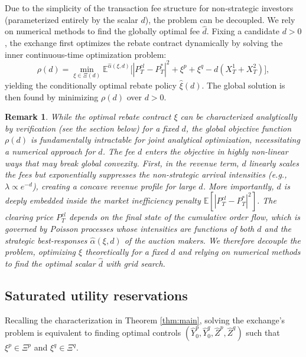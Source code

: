 \documentclass[12pt]{article}
\newtheorem{remark}[theorem2]{Remark}
\begin{document}
Due to the simplicity of the transaction fee structure for non-strategic investors (parameterized entirely by the scalar $d$), the problem can be decoupled. We rely on numerical methods to find the globally optimal fee $\hat{d}$. Fixing a candidate $d>0$, the exchange first optimizes the rebate contract dynamically by solving the inner continuous-time optimization problem:
\begin{equation}\label{eq:exchange_incentive}
    \rho(d) = \min_{\xi \in \Xi(d)} \mathbb{E}^{\hat{\alpha}(\xi,d)}\Big[ |P^{cl}_T - P_T^{*}|^2 + \xi^p + \xi^q - d(X^1_T + X^2_T) \Big],
\end{equation}
yielding the conditionally optimal rebate policy $\hat{\xi}(d)$. The global solution is then found by minimizing $\rho(d)$ over $d > 0$.

\begin{remark}
While the optimal rebate contract $\xi$ can be characterized analytically by verification (see the section below) for a fixed $d$, the global objective function $\rho(d)$ is fundamentally intractable for joint analytical optimization, necessitating a numerical approach for $\hat{d}$. The fee $d$ enters the objective in highly non-linear ways that may break global convexity. First, in the revenue term, $d$ linearly scales the fees but exponentially suppresses the non-strategic arrival intensities (e.g., $\lambda \propto e^{-d}$), creating a concave revenue profile for large $d$. More importantly, $d$ is deeply embedded inside the market inefficiency penalty $\mathbb{E}[|P^{cl}_T - P_T^{*}|^2]$. The clearing price $P^{cl}_T$ depends on the final state of the cumulative order flow, which is governed by Poisson processes whose intensities are functions of both $d$ and the strategic best-responses $\hat{\alpha}(\xi,d)$ of the auction makers. We therefore decouple the problem, optimizing $\xi$ theoretically for a fixed $d$ and relying on numerical methods to find the optimal scalar $\hat{d}$ with grid search.
\end{remark}
\subsection{Saturated utility reservations}\label{section:saturated}

Recalling the characterization in Theorem \ref{thm:main}, solving the exchange's problem is equivalent to finding optimal controls $(\hat{Y}_0^p, \hat{Y}_0^q, \hat{Z}^p, \hat{Z}^q)$ such that $\xi^p \in \Xi^p$ and $\xi^q \in \Xi^q$. 
\end{document}
